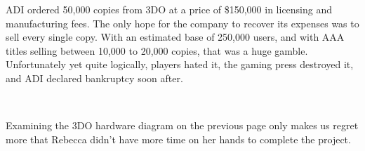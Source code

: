 \par
ADI ordered 50,000 copies from 3DO at a price of \$150,000 in licensing and manufacturing fees. The only hope for the company to recover its expenses was to sell every single copy. With an estimated base of 250,000 users, and with AAA titles selling between 10,000 to 20,000 copies, that was a huge gamble. Unfortunately yet quite logically, players hated it, the gaming press destroyed it, and ADI declared bankruptcy soon after. \\
\par
{}\\
\par
\vspace{20pt}


Examining the 3DO hardware diagram on the previous page only makes us regret more that Rebecca didn't have more time on her hands to complete the project.\\
\par

